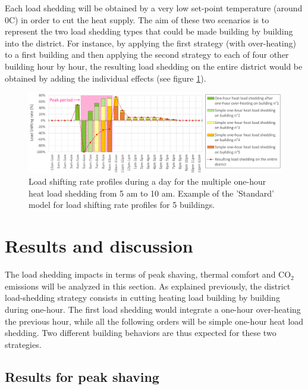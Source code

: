 \documentclass[buildings,article,submit,moreauthors,pdftex,10pt,a4paper]{mdpi}
\theoremstyle{mdpi}
\newcounter{ex}
\newcounter{re}
\theoremstyle{mdpidefinition}
\begin{document}
Each load shedding will be obtained by a very low set-point temperature (around 0\textdegree{}C) in order to cut the heat supply. The aim of these two scenarios is to represent the two load shedding types that could be made building by building into the district. For instance, by applying the first strategy (with over-heating) to a first building and then applying the second strategy to each of four other building hour by hour, the resulting load shedding on the entire district would be obtained by adding the individual effects (see figure \ref{multiple-load-shedding}). 

\begin{figure}[H]
\centering
	\includegraphics[width=15cm]{Figure_3.png}
	\caption{Load shifting rate profiles during a day for the multiple one-hour heat load shedding from 5 am to 10 am. Example of the 'Standard' model for load shifting rate profiles for 5 buildings.}
    \label{multiple-load-shedding}
\end{figure}


\section{Results and discussion}
The load shedding impacts in terms of peak shaving, thermal comfort and CO$_2$ emissions will be analyzed in this section. 
As explained previously, the district load-shedding strategy consists in cutting heating load building by building during one-hour. The first load shedding would integrate a one-hour over-heating the previous hour, while all the following orders will be simple one-hour heat load shedding. Two different building behaviors are thus expected for these two strategies.

\subsection{Results for peak shaving}
\label{results_peak_shaving}
\end{document}
